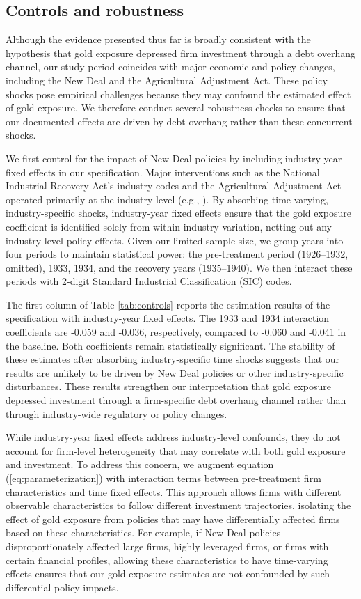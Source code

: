 \subsection{Controls and robustness}
\label{sec:cont}
\noindent
Although the evidence presented thus far is broadly consistent with the hypothesis that gold exposure depressed firm investment through a debt overhang channel, our study period coincides with major economic and policy changes, including the New Deal and the Agricultural Adjustment Act. These policy shocks pose empirical challenges because they may confound the estimated effect of gold exposure. We therefore conduct several robustness checks to ensure that our documented effects are driven by debt overhang rather than these concurrent shocks.

We first control for the impact of New Deal policies by including industry-year fixed effects in our specification. Major interventions such as the National Industrial Recovery Act's industry codes and the Agricultural Adjustment Act operated primarily at the industry level (e.g., \cite{Cole2004}). By absorbing time-varying, industry-specific shocks, industry-year fixed effects ensure that the gold exposure coefficient is identified solely from within-industry variation, netting out any industry-level policy effects. Given our limited sample size, we group years into four periods to maintain statistical power: the pre-treatment period (1926--1932, omitted), 1933, 1934, and the recovery years (1935--1940). We then interact these periods with 2-digit Standard Industrial Classification (SIC) codes.

The first column of Table \ref{tab:controls} reports the estimation results of the specification with industry-year fixed effects. The 1933 and 1934 interaction coefficients are -0.059 and -0.036, respectively, compared to -0.060 and -0.041 in the baseline. Both coefficients remain statistically significant. The stability of these estimates after absorbing industry-specific time shocks suggests that our results are unlikely to be driven by New Deal policies or other industry-specific disturbances. These results strengthen our interpretation that gold exposure depressed investment through a firm-specific debt overhang channel rather than through industry-wide regulatory or policy changes.

While industry-year fixed effects address industry-level confounds, they do not account for firm-level heterogeneity that may correlate with both gold exposure and investment. To address this concern, we augment equation (\ref{eq:parameterization}) with interaction terms between pre-treatment firm characteristics and time fixed effects. This approach allows firms with different observable characteristics to follow different investment trajectories, isolating the effect of gold exposure from policies that may have differentially affected firms based on these characteristics. For example, if New Deal policies disproportionately affected large firms, highly leveraged firms, or firms with certain financial profiles, allowing these characteristics to have time-varying effects ensures that our gold exposure estimates are not confounded by such differential policy impacts.

